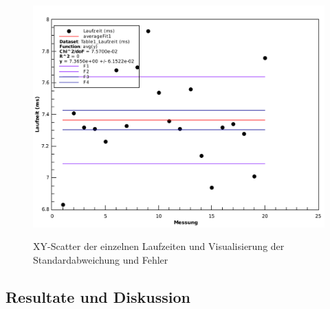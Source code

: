 \begin{figure}[h!]
    \center
    \caption{XY-Scatter der einzelnen Laufzeiten und Visualisierung der Standardabweichung und Fehler}
    \includegraphics[width=.85\textwidth]{qtiplot/schallgeschwindigkeit}
    \label{fig:schallgeschwindigkeit}
\end{figure}




\subsection{Resultate und Diskussion}


